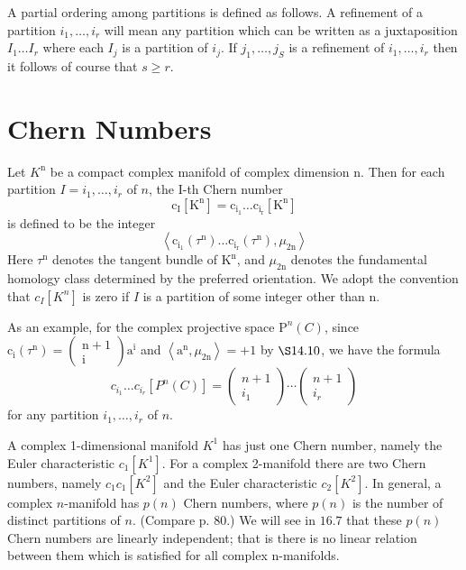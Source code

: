 \documentclass[10pt]{article}
\begin{document}
A partial ordering among partitions is defined as follows. A refinement of a partition $i_{1}, \ldots, i_{r}$ will mean any partition which can be written as a juxtaposition $I_{1} \ldots I_{r}$ where each $I_{j}$ is a partition of $i_{j}$. If $j_{1}, \ldots, j_{S}$ is a refinement of $i_{1}, \ldots, i_{r}$ then it follows of course that $s \geq r$.

\section{Chern Numbers}
Let $K^{\mathrm{n}}$ be a compact complex manifold of complex dimension $\mathrm{n}$. Then for each partition $I=i_{1}, \ldots, i_{r}$ of $n$, the I-th Chern number
$$
\mathrm{c}_{\mathrm{I}}\left[\mathrm{K}^{\mathrm{n}}\right]=\mathrm{c}_{\mathrm{i}_{1}} \ldots \mathrm{c}_{\mathrm{i}_{\mathrm{r}}}\left[\mathrm{K}^{\mathrm{n}}\right]
$$
is defined to be the integer
$$
\left\langle\mathrm{c}_{\mathrm{i}_{1}}\left(\tau^{\mathrm{n}}\right) \ldots \mathrm{c}_{\mathrm{i}_{\mathrm{r}}}\left(\tau^{\mathrm{n}}\right), \mu_{2 \mathrm{n}}\right\rangle
$$
Here $\tau^{\mathrm{n}}$ denotes the tangent bundle of $\mathrm{K}^{\mathrm{n}}$, and $\mu_{2 \mathrm{n}}$ denotes the fundamental homology class determined by the preferred orientation. We adopt the convention that $c_{I}\left[K^{n}\right]$ is zero if $I$ is a partition of some integer other than $\mathrm{n}$.

As an example, for the complex projective space $\mathrm{P}^{n}(C)$, since $\mathrm{c}_{\mathrm{i}}\left(\tau^{\mathrm{n}}\right)=\left(\begin{array}{c}\mathrm{n}+1 \\ \mathrm{i}\end{array}\right) \mathrm{a}^{\mathrm{i}}$ and $\left\langle\mathrm{a}^{\mathrm{n}}, \mu_{2 \mathrm{n}}\right\rangle=+1$ by $\S 14.10$, we have the formula
$$
c_{i_{1}} \ldots c_{i_{r}}\left[P^{n}(C)\right]=\left(\begin{array}{c}
n+1 \\
i_{1}
\end{array}\right) \cdots\left(\begin{array}{c}
n+1 \\
i_{r}
\end{array}\right)
$$
for any partition $i_{1}, \ldots, i_{r}$ of $n$.

A complex 1-dimensional manifold $K^{1}$ has just one Chern number, namely the Euler characteristic $c_{1}\left[K^{1}\right]$. For a complex 2-manifold there are two Chern numbers, namely $c_{1} c_{1}\left[K^{2}\right]$ and the Euler characteristic $c_{2}\left[K^{2}\right]$. In general, a complex $n$-manifold has $p(n)$ Chern numbers, where $p(n)$ is the number of distinct partitions of $n$. (Compare p. 80.) We will see in $16.7$ that these $p(n)$ Chern numbers are linearly independent; that is there is no linear relation between them which is satisfied for all complex n-manifolds.
\end{document}
